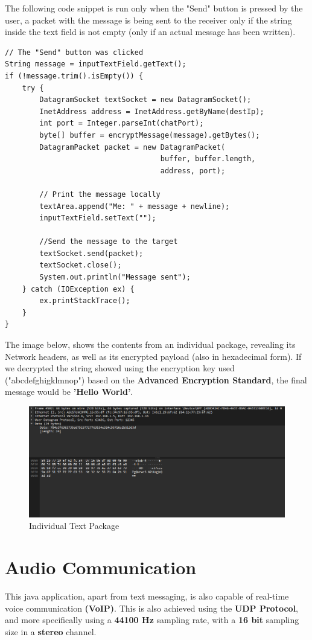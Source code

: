 \documentclass[12pt]{report}
\begin{document}
\newpage
The following code snippet is run only when the "Send" button is pressed by the user, a packet with the message is being sent to the receiver only if the string inside the text field is not empty (only if an actual message has been written).
\begin{lstlisting}[style=javastyle]
// The "Send" button was clicked
String message = inputTextField.getText();
if (!message.trim().isEmpty()) {
	try {
		DatagramSocket textSocket = new DatagramSocket();
		InetAddress address = InetAddress.getByName(destIp);
		int port = Integer.parseInt(chatPort);
		byte[] buffer = encryptMessage(message).getBytes();
		DatagramPacket packet = new DatagramPacket(
                                    buffer, buffer.length, 
                                    address, port);

		// Print the message locally
		textArea.append("Me: " + message + newline);
		inputTextField.setText("");

		//Send the message to the target
		textSocket.send(packet);
		textSocket.close();
		System.out.println("Message sent");
	} catch (IOException ex) {
		ex.printStackTrace();
	}
}
\end{lstlisting}
\vfill
The image below, shows the contents from an individual package, revealing its Network headers, as well as its encrypted payload (also in hexadecimal form). If we decrypted the string showed using the encryption key used ("abcdefghigklmnop") based on the \textbf{Advanced Encryption Standard}, the final message would be \textbf{'Hello World'}.
\begin{figure}[h!]
    \centering
    \includegraphics[width=1\linewidth]{Screenshot 2024-12-12 112958.png}
    \caption{Individual Text Package}
    \label{fig:enter-label}
\end{figure}

\newpage
\section{Audio Communication}
This java application, apart from text messaging, is also capable of real-time voice communication \textbf{(VoIP)}. This is also achieved using the \textbf{UDP Protocol}, and more specifically using a \textbf{44100 Hz} sampling rate, with a \textbf{16 bit} sampling size in a \textbf{stereo} channel.
\end{document}
